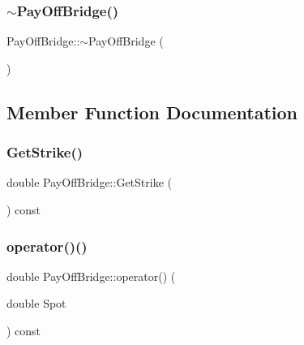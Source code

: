 \hypertarget{classPayOffBridge_adce15b3a19db6f77856f9d755cc8e549}{}\label{classPayOffBridge_adce15b3a19db6f77856f9d755cc8e549} 
\subsubsection{\texorpdfstring{$\sim$\+Pay\+Off\+Bridge()}{~PayOffBridge()}}
{\footnotesize\ttfamily Pay\+Off\+Bridge\+::$\sim$\+Pay\+Off\+Bridge (\begin{DoxyParamCaption}{ }\end{DoxyParamCaption})}



\subsection{Member Function Documentation}
\hypertarget{classPayOffBridge_aa37a5dedbef7fdc968255504a77c33e3}{}\label{classPayOffBridge_aa37a5dedbef7fdc968255504a77c33e3} 
\subsubsection{\texorpdfstring{Get\+Strike()}{GetStrike()}}
{\footnotesize\ttfamily double Pay\+Off\+Bridge\+::\+Get\+Strike (\begin{DoxyParamCaption}{ }\end{DoxyParamCaption}) const\hspace{0.3cm}{\ttfamily [inline]}}

\hypertarget{classPayOffBridge_a1c8822e8905a5dc685c291efd9fd50f3}{}\label{classPayOffBridge_a1c8822e8905a5dc685c291efd9fd50f3} 
\subsubsection{\texorpdfstring{operator()()}{operator()()}}
{\footnotesize\ttfamily double Pay\+Off\+Bridge\+::operator() (\begin{DoxyParamCaption}\item[{double}]{Spot }\end{DoxyParamCaption}) const\hspace{0.3cm}{\ttfamily [inline]}}

